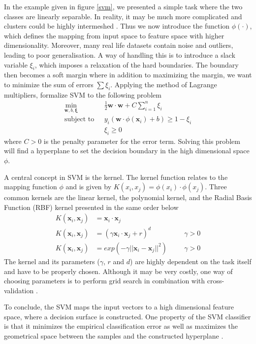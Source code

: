 In the example given in figure \ref{svm}, we presented a simple task where the two classes are linearly separable. In reality, it may be much more complicated and clusters could be highly intermeshed \citep{campbell2011}. Thus we now introduce the function $\phi(\cdot)$, which defines the mapping from input space to feature space with higher dimensionality. Moreover, many real life datasets contain noise and outliers, leading to poor generalisation. A way of handling this is to introduce a slack variable $\xi_i$, which imposes a relaxation of the hard boundaries. The boundary then becomes a soft margin where in addition to maximizing the margin, we want to minimize the sum of errors $\sum \xi_i$. Applying the method of Lagrange multipliers, \citet{campbell2011} formalize SVM to the following problem
\begin{align}
    \nonumber
    \min_{\bm{w},b,\bm{\xi}}\text{~~}&\frac{1}{2}\bm{w} \cdot \bm{w}+C\sum_{i=1}^{n} \xi_i \\ 
    \text{subject to~~}&y_i(\bm{w}\cdot \phi(\bm{x}_i)+b)\geq 1-\xi_i\\ 
    &\xi_i\geq 0 \nonumber
\end{align}
where $C>0$ is the penalty parameter for the error term. Solving this problem will find a hyperplane to set the decision boundary in the high dimensional space $\phi$.

A central concept in SVM is the kernel. The kernel function relates to the mapping function $\phi$ and is given by $K(x_i,x_j)=\phi(x_i)\cdot \phi(x_j)$. Three common kernels are the linear kernel, the polynomial kernel, and the Radial Basis Function (RBF) kernel presented in the same order below
\begin{align}
K(\bm{x}_i,\bm{x}_j)&=\bm{x}_i \cdot \bm{x}_j & \nonumber \\ 
K(\bm{x}_i,\bm{x}_j)&=(\gamma \bm{x}_i \cdot \bm{x}_j + r)^d \text{~~~~~}&\gamma>0\\
K(\bm{x}_i,\bm{x}_j)&=exp(-\gamma ||\bm{x}_i-\bm{x}_j||^2) \text{~~~~~}&\gamma>0 \nonumber
\end{align}
The kernel and its parameters ($\gamma$, $r$ and $d$) are highly dependent on the task itself and have to be properly chosen. Although it may be very costly, one way of choosing parameters is to perform grid search in combination with cross-validation \citep{Hsu10apractical}.

To conclude, the SVM maps the input vectors to a high dimensional feature space, where a decision surface is constructed. One property of the SVM classifier is that it minimizes the empirical classification error as well as maximizes the geometrical space between the samples and the constructed hyperplane \citep{Cortes1995}.

